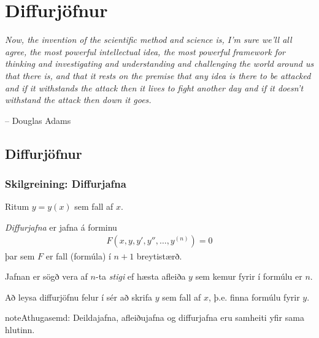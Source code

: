 \documentclass[a4paper,10pt,icelandic]{sphinxmanual}
\begin{document}
\chapter{Diffurjöfnur}
\label{kafli08:diffurjofnur}\label{kafli08::doc}
\emph{Now, the invention of the scientific method and science is, I'm sure
we'll all agree, the most powerful intellectual idea, the most powerful
framework for thinking and investigating and understanding and challenging
the world around us that there is, and that it rests on the premise that
any idea is there to be attacked and if it withstands the attack then it
lives to fight another day and if it doesn't withstand the attack then
down it goes.}

-- Douglas Adams


\section{Diffurjöfnur}
\label{kafli08:index-0}\label{kafli08:id1}

\subsection{Skilgreining: Diffurjafna}
\label{kafli08:skilgreining-diffurjafna}\label{kafli08:diffurjafna}
Ritum \(y=y(x)\) sem fall af \(x\).

\textit{Diffurjafna} er jafna á forminu
\begin{equation*}
\begin{split}F(x, y, y', y'', \ldots, y^{(n)})=0\end{split}
\end{equation*}
þar sem \(F\) er fall (formúla) í \(n+1\) breytistærð.

Jafnan er sögð vera af \(n\)-ta \emph{stigi} ef hæsta afleiða \(y\)
sem kemur fyrir í formúlu er \(n\).

Að leysa diffurjöfnu felur í sér að skrifa \(y\) sem fall
af \(x\), þ.e. finna formúlu fyrir \(y\).

\begin{notice}{note}{Athugasemd:}
Deildajafna, afleiðujafna og diffurjafna eru samheiti yfir
sama hlutinn.
\end{notice}
\end{document}
